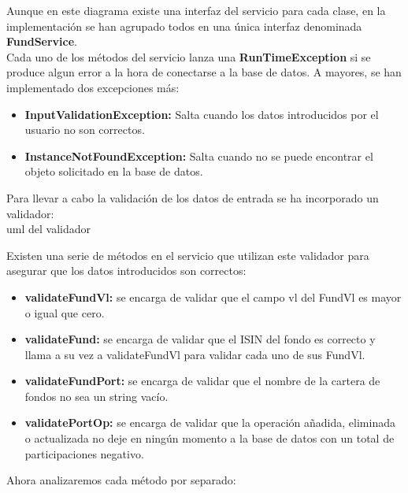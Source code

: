 \documentclass[12pt, a4paper]{article}
\begin{document}
Aunque en este diagrama existe una interfaz del servicio para cada clase, en la implementación se han agrupado todos en una única interfaz denominada \textbf{FundService}.\\

Cada uno de los métodos del servicio lanza una \textbf{RunTimeException} si se produce algun error a la hora de conectarse a la base de datos. A mayores, se han implementado dos excepciones más:

\begin{itemize}
	\item \textbf{InputValidationException:} Salta cuando los datos introducidos por el usuario no son correctos.
	\item \textbf{InstanceNotFoundException:} Salta cuando no se puede encontrar el objeto solicitado en la base de datos.
\end{itemize}


Para llevar a cabo la validación de los datos de entrada se ha incorporado un validador: \\

uml del validador\\

\newpage

Existen una serie de métodos en el servicio que utilizan este validador para asegurar que los datos introducidos son correctos:

\begin{itemize}
	\item \textbf{validateFundVl:} se encarga de validar que el campo vl del FundVl es mayor o igual que cero.
	\item \textbf{validateFund:} se encarga de validar que el \gls{ISIN} del fondo es correcto y llama a su vez a validateFundVl para validar cada uno de sus FundVl.
	\item \textbf{validateFundPort:} se encarga de validar que el nombre de la cartera de fondos no sea un string vacío.
	\item \textbf{validatePortOp:} se encarga de validar que la operación añadida, eliminada o actualizada no deje en ningún momento a la base de datos con un total de participaciones negativo.
\end{itemize}

Ahora analizaremos cada método por separado:
\end{document}
